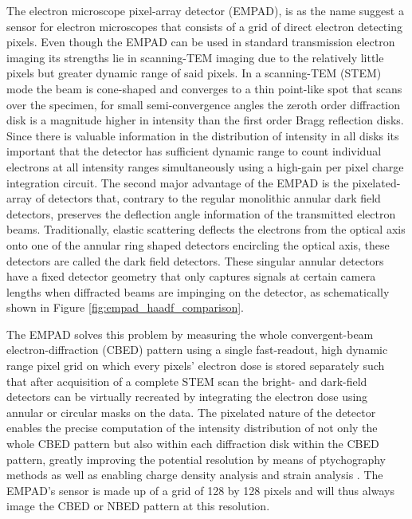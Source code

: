 The electron microscope pixel-array detector (EMPAD),  is as the name suggest a sensor for electron microscopes that consists of a grid of direct electron detecting pixels. 
%
Even though the EMPAD can be used in standard transmission electron imaging its strengths lie in scanning-TEM imaging due to the relatively little pixels but greater dynamic range of said pixels.
%
In a scanning-TEM (STEM) mode the beam is cone-shaped and converges to a thin point-like spot that scans over the specimen, for small semi-convergence angles the zeroth order diffraction disk is a magnitude higher in intensity than the first order Bragg reflection disks.
%
Since there is valuable information in the distribution of intensity in all disks its important that the detector has sufficient dynamic range to count individual electrons at all intensity ranges simultaneously using a high-gain per pixel charge integration circuit. 
%
The second major advantage of the EMPAD is the pixelated-array of detectors that, contrary to the regular monolithic annular dark field detectors, preserves the deflection angle information of the transmitted electron beams.
%
Traditionally, elastic scattering deflects the electrons from the optical axis onto one of the annular ring shaped detectors encircling the optical axis, these detectors are called the dark field detectors.
%
These singular annular detectors have a fixed detector geometry that only captures signals at certain camera lengths when diffracted beams are impinging on the detector, as schematically shown in Figure \ref{fig:empad_haadf_comparison}. 

The EMPAD solves this problem by measuring the whole convergent-beam electron-diffraction (CBED) pattern using a single fast-readout, high dynamic range pixel grid on which every pixels' electron dose is stored separately such that after acquisition of a complete STEM scan the bright- and dark-field detectors can be virtually recreated by integrating the electron dose using annular or circular masks on the data.
%
The pixelated nature of the detector enables the precise computation of the intensity distribution of not only the whole CBED pattern but also within each diffraction disk within the CBED pattern, greatly improving the potential resolution by means of ptychography methods \cite{pennycookEfficientPhaseContrast2015, yangEfficientPhaseContrast2015a} as well as enabling charge density analysis \cite{hachtelSubAngstromElectricField2018,wenMapping1DConfined2022,fangAtomicElectrostaticMaps2019} and strain analysis \cite{hanStrainMappingTwoDimensional2018, ophusFourDimensionalScanningTransmission2019}.
%
The EMPAD's sensor is made up of a grid of 128 by 128 pixels and will thus always image the CBED or NBED pattern at this resolution. 

